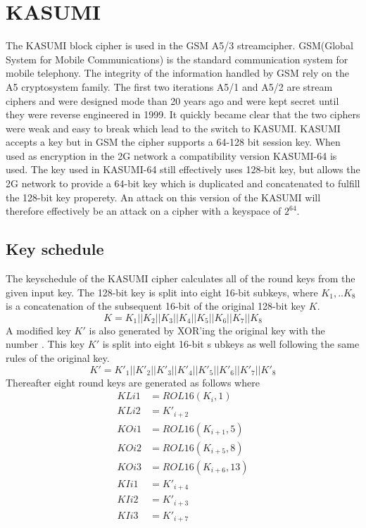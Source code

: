 \chapter{KASUMI}
\label{ch:kas}

The KASUMI block cipher is used in the GSM A5/3 streamcipher. GSM(Global System for Mobile Communications) is the standard communication system for mobile telephony. The integrity of the information handled by GSM rely on the A5 cryptosystem family. The first two iterations A5/1 and A5/2 are stream ciphers and were designed mode than 20 years ago and were kept secret until they were reverse engineered in 1999\cite{A512}. It quickly became clear that the two ciphers  were weak and easy to break which lead to the switch to KASUMI. KASUMI accepts a  key but in GSM the cipher supports a 64-128 bit session key. When used as
encryption in the 2G network a compatibility version KASUMI-64 is
used. The key used in KASUMI-64 still effectively uses 128-bit key,
but allows the 2G network to provide a 64-bit key which is duplicated
and concatenated to fulfill the 128-bit key properety. An attack on
this version of the KASUMI will therefore effectively be an attack on
a cipher with a keyspace of $2^{64}$.
\section{Key schedule}
The keyschedule of the KASUMI cipher calculates all of the round keys
from the given input key. The 128-bit key is split into eight 16-bit
subkeys, where $K_1,..K_8$ is a concatenation of the subsequent 16-bit of
the original 128-bit key $K$.
\[K = K_1 || K_2 || K_3 || K_4 || K_5 || K_6 || K_7 || K_8\]
A modified key $K'$ is also generated by XOR'ing the original key with
the number . This key $K'$ is split
into eight 16-bit s
ubkeys as well following the same rules of the
original key.
\[K' = K'_1 || K'_2 || K'_3 || K'_4 || K'_5 || K'_6 || K'_7 || K'_8\]
Thereafter eight round keys are generated as follows where 
\begin{align*}
  KLi1 &= ROL16(K_i,1)\\
  KLi2 &= K'_{i+2}\\
  KOi1 &= ROL16(K_{i + 1},5)\\
  KOi2 &= ROL16(K_{i + 5},8)\\
  KOi3 &= ROL16(K_{i + 6},13)\\
  KIi1 &= K'_{i+4}\\
  KIi2 &= K'_{i+3}\\
  KIi3 &= K'_{i+7}\\
\end{align*}
